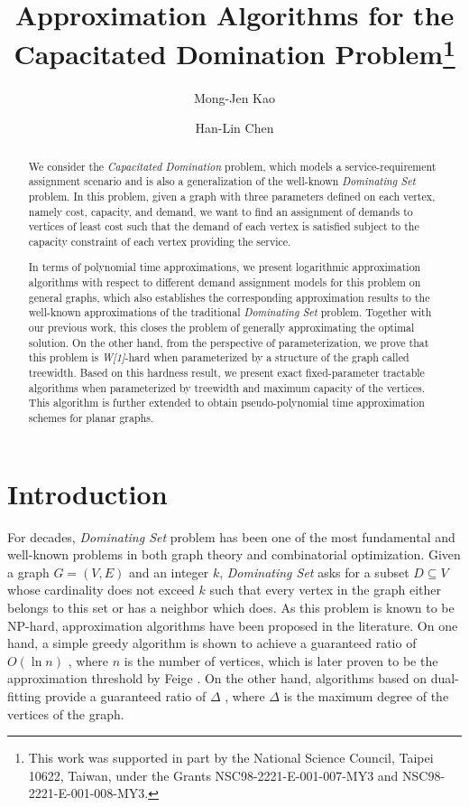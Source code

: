 \documentclass[a4paper,11pt]{article}
\title{\bf Approximation Algorithms for the Capacitated Domination Problem\thanks{
This work was supported in part by the National Science Council, Taipei 10622, Taiwan, under
the Grants NSC98-2221-E-001-007-MY3 and NSC98-2221-E-001-008-MY3.}}
\author[ ]{Mong-Jen Kao}
\author[ ]{Han-Lin Chen}
\affil[ ]{Department of Computer Science and Information Engineering, \newline
National Taiwan University, Taiwan.}
\affil[ ]{\newline Emails: d97021@csie.ntu.edu.tw, kalent37@ms89.url.com.tw}
\date{\empty}
\theoremstyle{definition}
\begin{document}
\maketitle



\begin{abstract}
We consider the {\em Capacitated Domination} problem, which models a
service-requirement assignment scenario and is also a
generalization of the well-known {\em Dominating Set} problem. In
this problem, given a graph with three parameters defined on each vertex, namely cost,
capacity, and demand, we want to find
an assignment of demands to vertices of least cost such that the demand of each vertex is
satisfied subject to the capacity constraint of each vertex providing the service.

In terms of polynomial time approximations, we present logarithmic approximation algorithms with respect to different demand assignment models for this problem on general
graphs, which also establishes the corresponding approximation
results to the well-known approximations of the
traditional {\em Dominating Set} problem. Together with our
previous work, this closes the problem of generally approximating
the optimal solution. On the other hand, from the perspective of
parameterization, we prove that this problem is {\it W[1]}-hard when parameterized by a structure of the graph called treewidth. Based on this hardness result, we present exact fixed-parameter tractable algorithms when parameterized by treewidth and maximum capacity of the vertices.
This algorithm is further extended to obtain pseudo-polynomial time approximation schemes for planar graphs.
\end{abstract}



\section{Introduction}

For decades, {\em Dominating Set} problem has been one of the most
fundamental and well-known problems in both 
graph theory and combinatorial optimization. Given a graph $G=(V,E)$ and an integer $k$,
{\em Dominating Set} asks for a subset $D\subseteq V$ whose cardinality
does not exceed $k$ such that every vertex in the graph either
belongs to this set or has a neighbor which does. As this problem is
known to be NP-hard, approximation algorithms have been proposed in
the literature. On one hand, a simple greedy algorithm is shown to
achieve a guaranteed ratio of $O(\ln n)$ \cite{VC79,804034,LL75}, where $n$ is the
number of vertices, which is later proven to be the approximation
threshold by Feige \cite{285059}. On the other hand, algorithms
based on dual-fitting provide a guaranteed ratio of $\Delta$
\cite{DSH82}, where $\Delta$ is the maximum degree of the vertices of the graph.
\end{document}
